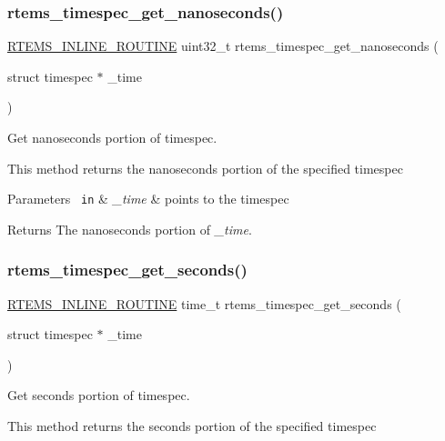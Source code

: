 \subsubsection{\texorpdfstring{rtems\_timespec\_get\_nanoseconds()}{rtems\_timespec\_get\_nanoseconds()}}
{\footnotesize\ttfamily \mbox{\hyperlink{group__RTEMSScoreBaseDefs_gac216239df231d5dbd15e3520b0b9313f}{R\+T\+E\+M\+S\+\_\+\+I\+N\+L\+I\+N\+E\+\_\+\+R\+O\+U\+T\+I\+NE}} uint32\+\_\+t rtems\+\_\+timespec\+\_\+get\+\_\+nanoseconds (\begin{DoxyParamCaption}\item[{struct timespec $\ast$}]{\+\_\+time }\end{DoxyParamCaption})}



Get nanoseconds portion of timespec. 

This method returns the nanoseconds portion of the specified timespec


\begin{DoxyParams}[1]{Parameters}
\mbox{\texttt{ in}}  & {\em \+\_\+time} & points to the timespec\\
\hline
\end{DoxyParams}
\begin{DoxyReturn}{Returns}
The nanoseconds portion of {\itshape \+\_\+time}. 
\end{DoxyReturn}
\mbox{\label{group__TimespecAPI_ga6f1ac4a1319b9e04ad6a054d5a31a6cb}} 
\subsubsection{\texorpdfstring{rtems\_timespec\_get\_seconds()}{rtems\_timespec\_get\_seconds()}}
{\footnotesize\ttfamily \mbox{\hyperlink{group__RTEMSScoreBaseDefs_gac216239df231d5dbd15e3520b0b9313f}{R\+T\+E\+M\+S\+\_\+\+I\+N\+L\+I\+N\+E\+\_\+\+R\+O\+U\+T\+I\+NE}} time\+\_\+t rtems\+\_\+timespec\+\_\+get\+\_\+seconds (\begin{DoxyParamCaption}\item[{struct timespec $\ast$}]{\+\_\+time }\end{DoxyParamCaption})}



Get seconds portion of timespec. 

This method returns the seconds portion of the specified timespec


